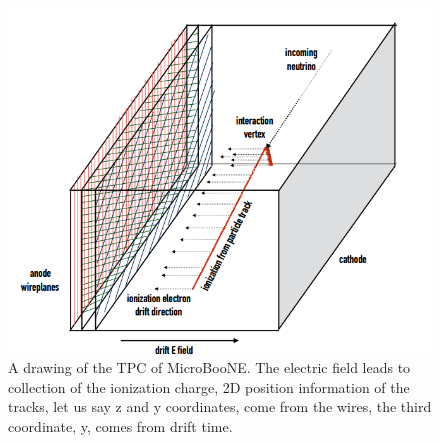 \documentclass[a4paper]{article}\linespread{1.4}
\begin{document}
\begin{figure}[h!] \centering \includegraphics[width=120mm,scale=1.0]{mbtpc.png} \caption{A drawing of the TPC of MicroBooNE. The electric field leads to collection of the ionization charge, 2D position information of the tracks, let us say z and y coordinates, come from the wires, the third coordinate, y, comes from drift time. \cite{PP}} \label{fig:mbtpc}\end{figure}  
\end{document}
